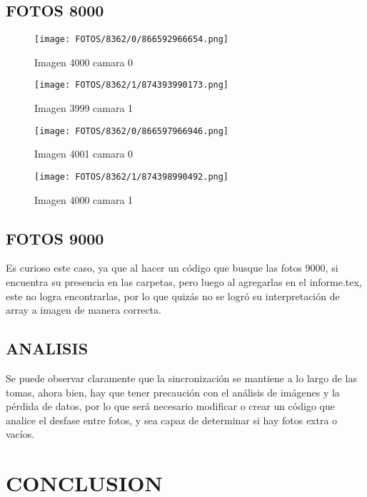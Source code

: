 \documentclass{article}
\begin{document}
\subsection{FOTOS 8000}

\begin{figure}[H]
  \centering
  \begin{minipage}[b]{0.45\textwidth}
    \centering
    \texttt{[image: FOTOS/8362/0/866592966654.png]}
    \caption{Imagen 4000 camara 0}
  \end{minipage}
  \begin{minipage}[b]{0.45\textwidth}
    \centering
    \texttt{[image: FOTOS/8362/1/874393990173.png]}
    \caption{Imagen 3999 camara 1}
  \end{minipage}
  \begin{minipage}[b]{0.45\textwidth}
    \centering
    \texttt{[image: FOTOS/8362/0/866597966946.png]}
    \caption{Imagen 4001 camara 0}
  \end{minipage}
  \begin{minipage}[b]{0.45\textwidth}
    \centering
    \texttt{[image: FOTOS/8362/1/874398990492.png]}
    \caption{Imagen 4000 camara 1}
  \end{minipage}
\end{figure}

\subsection{FOTOS 9000}

\noindent Es curioso este caso, ya que al hacer un código que busque las fotos 9000, si encuentra su presencia en las carpetas, pero luego al agregarlas en el informe.tex,
este no logra encontrarlas, por lo que quizás no se logró su interpretación de array a imagen de manera correcta.

\subsection{ANALISIS}

\noindent Se puede observar claramente que la sincronización se mantiene a lo largo de las tomas, ahora bien, hay que tener precaución con el análisis de imágenes y la pérdida de datos,
por lo que será necesario modificar o crear un código que analice el desfase entre fotos, y sea capaz de determinar si hay fotos extra o vacíos. 

\section{CONCLUSION}
\end{document}

